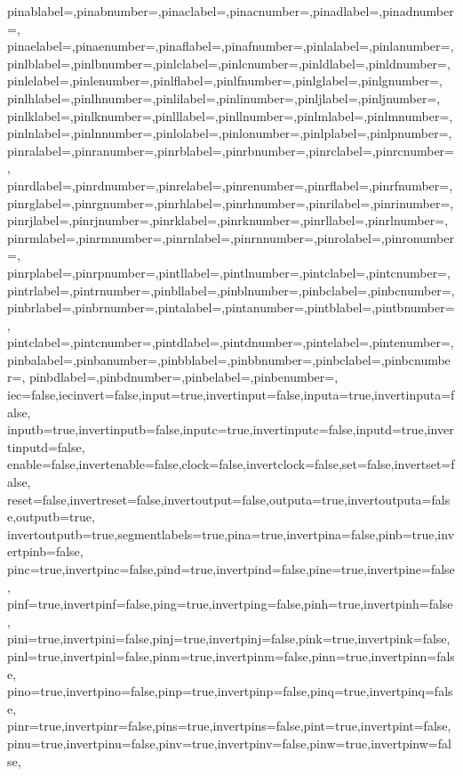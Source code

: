 {  pinablabel={},pinabnumber={},pinaclabel={},pinacnumber={},pinadlabel={},pinadnumber={},
  pinaelabel={},pinaenumber={},pinaflabel={},pinafnumber={},pinlalabel={},pinlanumber={},
  pinlblabel={},pinlbnumber={},pinlclabel={},pinlcnumber={},pinldlabel={},pinldnumber={},
  pinlelabel={},pinlenumber={},pinlflabel={},pinlfnumber={},pinlglabel={},pinlgnumber={},
  pinlhlabel={},pinlhnumber={},pinlilabel={},pinlinumber={},pinljlabel={},pinljnumber={},
  pinlklabel={},pinlknumber={},pinlllabel={},pinllnumber={},pinlmlabel={},pinlmnumber={},
  pinlnlabel={},pinlnnumber={},pinlolabel={},pinlonumber={},pinlplabel={},pinlpnumber={},
  pinralabel={},pinranumber={},pinrblabel={},pinrbnumber={},pinrclabel={},pinrcnumber={},
  pinrdlabel={},pinrdnumber={},pinrelabel={},pinrenumber={},pinrflabel={},pinrfnumber={},
  pinrglabel={},pinrgnumber={},pinrhlabel={},pinrhnumber={},pinrilabel={},pinrinumber={},
  pinrjlabel={},pinrjnumber={},pinrklabel={},pinrknumber={},pinrllabel={},pinrlnumber={},
  pinrmlabel={},pinrmnumber={},pinrnlabel={},pinrnnumber={},pinrolabel={},pinronumber={},
  pinrplabel={},pinrpnumber={},pintllabel={},pintlnumber={},pintclabel={},pintcnumber={},
  pintrlabel={},pintrnumber={},pinbllabel={},pinblnumber={},pinbclabel={},pinbcnumber={},
  pinbrlabel={},pinbrnumber={},pintalabel={},pintanumber={},pintblabel={},pintbnumber={},
  pintclabel={},pintcnumber={},pintdlabel={},pintdnumber={},pintelabel={},pintenumber={},
  pinbalabel={},pinbanumber={},pinbblabel={},pinbbnumber={},pinbclabel={},pinbcnumber={},
  pinbdlabel={},pinbdnumber={},pinbelabel={},pinbenumber={},
  iec=false,iecinvert=false,input=true,invertinput=false,inputa=true,invertinputa=false,
  inputb=true,invertinputb=false,inputc=true,invertinputc=false,inputd=true,invertinputd=false,
  enable=false,invertenable=false,clock=false,invertclock=false,set=false,invertset=false,
  reset=false,invertreset=false,invertoutput=false,outputa=true,invertoutputa=false,outputb=true,
  invertoutputb=true,segmentlabels=true,pina=true,invertpina=false,pinb=true,invertpinb=false,
  pinc=true,invertpinc=false,pind=true,invertpind=false,pine=true,invertpine=false,
  pinf=true,invertpinf=false,ping=true,invertping=false,pinh=true,invertpinh=false,
  pini=true,invertpini=false,pinj=true,invertpinj=false,pink=true,invertpink=false,
  pinl=true,invertpinl=false,pinm=true,invertpinm=false,pinn=true,invertpinn=false,
  pino=true,invertpino=false,pinp=true,invertpinp=false,pinq=true,invertpinq=false,
  pinr=true,invertpinr=false,pins=true,invertpins=false,pint=true,invertpint=false,
  pinu=true,invertpinu=false,pinv=true,invertpinv=false,pinw=true,invertpinw=false,
}
